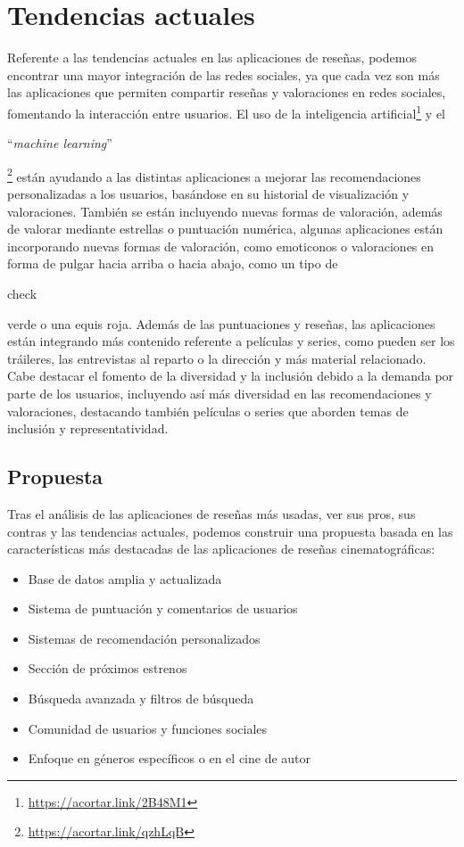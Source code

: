 \section{Tendencias actuales}

Referente a las tendencias actuales en las aplicaciones de reseñas, podemos encontrar una mayor integración de las redes sociales, ya que cada vez son más las aplicaciones que permiten compartir reseñas y valoraciones en redes sociales, fomentando la interacción entre usuarios. El uso de la inteligencia artificial\footnote{\url{https://acortar.link/2B48M1}} y el \begin{otherlanguage}{english}``\textit{machine learning}''\end{otherlanguage} \cite{MachLear} \footnote{\url{https://acortar.link/qzhLqB}} están ayudando a las distintas aplicaciones a mejorar las recomendaciones personalizadas a los usuarios, basándose en su historial de visualización y valoraciones. También se están incluyendo nuevas formas de valoración, además de valorar mediante estrellas o puntuación numérica, algunas aplicaciones están incorporando nuevas formas de valoración, como emoticonos o valoraciones en forma de pulgar hacia arriba o hacia abajo, como un tipo de \begin{otherlanguage}{english}check \end{otherlanguage} verde o una equis roja. Además de las puntuaciones y reseñas, las aplicaciones están integrando más contenido referente a películas y series, como pueden ser los tráileres, las entrevistas al reparto o la dirección y más material relacionado. Cabe destacar el fomento de la diversidad y la inclusión debido a la demanda por parte de los usuarios, incluyendo así más diversidad en las recomendaciones y valoraciones, destacando también películas o series que aborden temas de inclusión y representatividad.

\subsection{Propuesta}

Tras el análisis de las aplicaciones de reseñas más usadas, ver sus pros, sus contras y las tendencias actuales, podemos construir una propuesta basada en las características más destacadas de las aplicaciones de reseñas cinematográficas:

\begin{itemize}
\item Base de datos amplia y actualizada
\item Sistema de puntuación y comentarios de usuarios
\item Sistemas de recomendación personalizados
\item Sección de próximos estrenos
\item Búsqueda avanzada y filtros de búsqueda
\item Comunidad de usuarios y funciones sociales
\item Enfoque en géneros específicos o en el cine de autor
\end{itemize}

